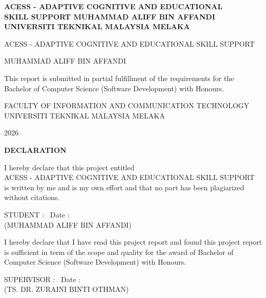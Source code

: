 \documentclass[12pt, oneside]{article} %
\def \maketitleone{
\centering
\begin{titlepage}
	\bf {
	ACESS - ADAPTIVE COGNITIVE AND EDUCATIONAL \\ 
	SKILL SUPPORT
	}
	\rm
	\vskip 3in
	\bf {MUHAMMAD ALIFF BIN AFFANDI}
	\rm
	\vskip 3in
	\bf {UNIVERSITI TEKNIKAL MALAYSIA MELAKA}
	
	
\end{titlepage}

\thispagestyle{empty}

\newpage
}
\begin{document}
\maketitleone

\restoregeometry

\setcounter{page}{1}
\justifying



\begin{center}

\vfill \null
\vspace{1cm}
{ACESS - ADAPTIVE COGNITIVE AND EDUCATIONAL SKILL SUPPORT}

\vskip 1.6in
{MUHAMMAD ALIFF BIN AFFANDI}

\vskip 1.6in
This report is submitted in partial fulfillment of the requirements for the \\
Bachelor of Computer Science (Software Development) with Honours.


\vskip 1.6in
FACULTY OF INFORMATION AND COMMUNICATION TECHNOLOGY \\
UNIVERSITI TEKNIKAL MALAYSIA MELAKA
	
\vspace{2mm}	
2026

\end{center}

\newpage


\begin{center}

\vfill\null
{}
{}
\textbf{DECLARATION}

\vspace{1.5cm}
I hereby declare that this project entitled \\
ACESS - ADAPTIVE COGNITIVE AND EDUCATIONAL SKILL SUPPORT \\
is written by me and is my own effort and that no part has been plagiarized without citations.

\vspace{1.5cm}
\noindent
STUDENT \; : \underline{\hspace{8cm}} \, Date :  \underline{\hspace{2.1cm}} \\[-2mm]
(MUHAMMAD ALIFF BIN AFFANDI) \hspace{1.2cm}

\vspace{4cm}
\noindent
I hereby declare that I have read this project report and found this project report is sufficient in term of the scope and quality for the award of Bachelor of Computer Science (Software Development) with Honours.

\vspace{1.5cm}
\noindent
SUPERVISOR \; : \underline{\hspace{8cm}} \, Date :  \underline{\hspace{2.1cm}} \\[-2mm]
(TS. DR. ZURAINI BINTI OTHMAN) \hspace{0.6cm}

\end{center}
\end{document}
